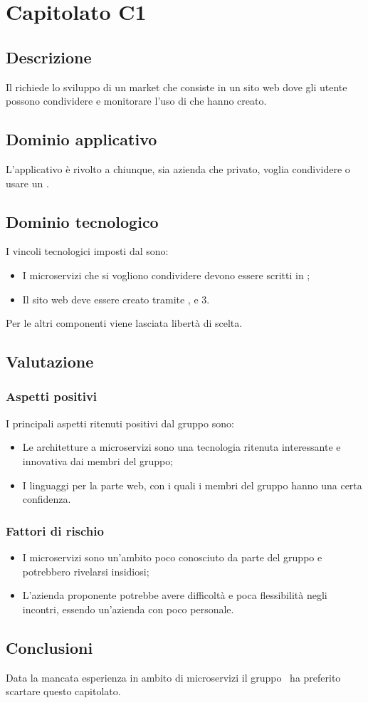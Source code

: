 \documentclass[../StudioDiFattibilita.tex]{subfiles}
\begin{document}
	\section{Capitolato C1}
		\subsection{Descrizione}
		Il  richiede lo sviluppo di un  market che consiste in un sito web dove gli utente possono condividere e monitorare l'uso di  che hanno creato.
		\subsection{Dominio applicativo}
		L'applicativo è rivolto a chiunque, sia azienda che privato, voglia condividere o usare un .
		\subsection{Dominio tecnologico} 
		I vincoli tecnologici imposti dal  sono:
		\begin{itemize}
			\item I microservizi che si vogliono condividere devono essere scritti in ;
			\item Il sito web deve essere creato tramite ,  e 3.
		\end{itemize}
		Per le altri componenti viene lasciata libertà di scelta.
		\subsection{Valutazione}
			\subsubsection{Aspetti positivi}
			I principali aspetti ritenuti positivi dal gruppo sono:
				\begin{itemize}
				\item Le architetture a microservizi sono una tecnologia ritenuta interessante e innovativa dai membri del gruppo; 
				\item I linguaggi per la parte web, con i quali i membri del gruppo hanno una certa confidenza.
			\end{itemize}
			\subsubsection{Fattori di rischio}
				\begin{itemize}
				\item I microservizi sono un'ambito poco conosciuto da parte del gruppo e potrebbero rivelarsi insidiosi;
				\item L'azienda proponente potrebbe avere difficoltà e poca flessibilità negli incontri, essendo un'azienda con poco personale.
			\end{itemize}
			\subsection{Conclusioni}
			Data la mancata esperienza in ambito di microservizi il gruppo \kaleidoscode\ ha preferito scartare questo capitolato.
\end{document}
